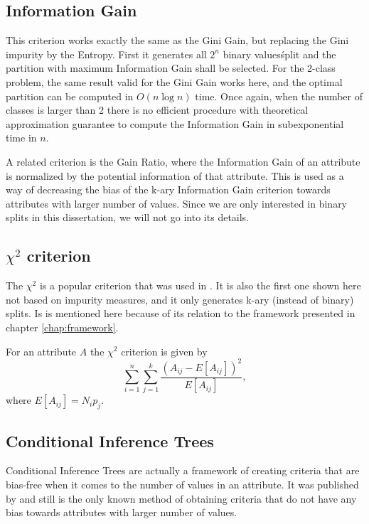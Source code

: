 \subsection{Information Gain}
This criterion works exactly the same as the Gini Gain, but replacing the Gini impurity by the Entropy. First it generates all $2^n$ binary values\' split and the partition with maximum Information Gain shall be selected.
For the 2-class problem, the same result valid for the Gini Gain works here, and the optimal partition  
can be computed  in $O(n \log n)$ time. Once again, when the number of classes is larger than 2 there is no efficient procedure with theoretical approximation guarantee to compute the Information Gain in subexponential time in $n$.

A related criterion is the Gain Ratio, where the Information Gain of an attribute is normalized by the potential information of that attribute. This is used as a way of decreasing the bias of the k-ary Information Gain criterion towards attributes with larger number of values. Since we are only interested in binary splits in this dissertation, we will not go into its details.


\subsection{$\chi^2$ criterion}
The $\chi^2$ is a popular criterion that was  used in \cite{Mingers.87}. It is also the first one shown here not based on impurity measures, and it only generates k-ary (instead of binary) splits. Is is mentioned here because of its relation to the framework presented in chapter \ref{chap:framework}.

For an attribute $A$ the $\chi^2$ criterion is given by 
\begin{equation}
\label{eq:chitest}
\sum_{i=1}^n \sum_{j=1}^k \frac{(A_{ij}-E[A_{ij}] )^2}{E[A_{ij}]},
\end{equation}
where $E[A_{ij}]=N_i p_j$.

\subsection{Conditional Inference Trees}
Conditional Inference Trees are actually a framework of creating criteria that are bias-free when it comes to the number of values in an attribute. It was published by \cite{Hothorn:2006:URP} and still is the only known method of obtaining criteria that do not have any bias towards attributes with larger number of values.


